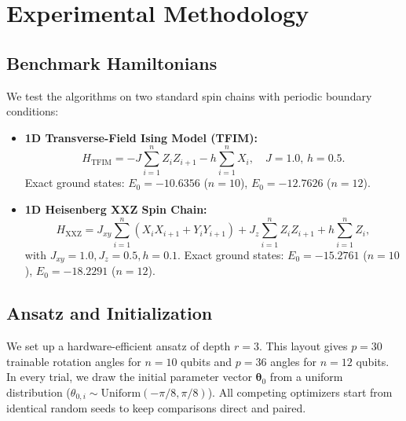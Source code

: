\documentclass[11pt,a4paper]{article}
\begin{document}
\section{Experimental Methodology}
\label{sec:setup}

\subsection{Benchmark Hamiltonians}
We test the algorithms on two standard spin chains with periodic boundary conditions:
\begin{itemize}
    \item \textbf{1D Transverse-Field Ising Model (TFIM):}
    \begin{equation}
    H_{\text{TFIM}} = -J \sum_{i=1}^n Z_i Z_{i+1} - h \sum_{i=1}^n X_i, \quad J = 1.0, \, h = 0.5.
    \end{equation}
    Exact ground states: $E_0 = -10.6356$ ($n=10$), $E_0 = -12.7626$ ($n=12$).
    \item \textbf{1D Heisenberg XXZ Spin Chain:}
    \begin{equation}
    H_{\text{XXZ}} = J_{xy} \sum_{i=1}^n (X_i X_{i+1} + Y_i Y_{i+1}) + J_z \sum_{i=1}^n Z_i Z_{i+1} + h \sum_{i=1}^n Z_i,
    \end{equation}
    with $J_{xy} = 1.0, J_z = 0.5, h = 0.1$. Exact ground states: $E_0 = -15.2761$ ($n=10$), $E_0 = -18.2291$ ($n=12$).
\end{itemize}

\subsection{Ansatz and Initialization}
We set up a hardware-efficient ansatz of depth $r=3$. This layout gives $p=30$ trainable rotation angles for $n=10$ qubits and $p=36$ angles for $n=12$ qubits. In every trial, we draw the initial parameter vector $\boldsymbol{\theta}_0$ from a uniform distribution ($\theta_{0,i} \sim \text{Uniform}(-\pi/8, \pi/8)$). All competing optimizers start from identical random seeds to keep comparisons direct and paired.
\end{document}
